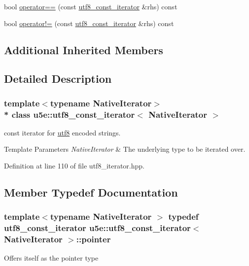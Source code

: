 {\bf }\par
\begin{DoxyCompactItemize}
\item 
bool \hyperlink{classu5e_1_1utf8__const__iterator_ac6110586d118a41b5eeac023f4788ccb}{operator==} (const \hyperlink{classu5e_1_1utf8__const__iterator}{utf8\+\_\+const\+\_\+iterator} \&rhs) const 
\item 
bool \hyperlink{classu5e_1_1utf8__const__iterator_a776a1dae46835c0871a945c0da418498}{operator!=} (const \hyperlink{classu5e_1_1utf8__const__iterator}{utf8\+\_\+const\+\_\+iterator} \&rhs) const 
\end{DoxyCompactItemize}

\subsection*{Additional Inherited Members}


\subsection{Detailed Description}
\subsubsection*{template$<$typename Native\+Iterator$>$\\*
class u5e\+::utf8\+\_\+const\+\_\+iterator$<$ Native\+Iterator $>$}

const iterator for \hyperlink{classu5e_1_1utf8}{utf8} encoded strings. 


\begin{DoxyTemplParams}{Template Parameters}
{\em Native\+Iterator} & The underlying type to be iterated over. \\
\hline
\end{DoxyTemplParams}


Definition at line 110 of file utf8\+\_\+iterator.\+hpp.



\subsection{Member Typedef Documentation}
\subsubsection[{\texorpdfstring{pointer}{pointer}}]{\setlength{\rightskip}{0pt plus 5cm}template$<$typename Native\+Iterator $>$ typedef {\bf utf8\+\_\+const\+\_\+iterator} {\bf u5e\+::utf8\+\_\+const\+\_\+iterator}$<$ Native\+Iterator $>$\+::{\bf pointer}}\hypertarget{classu5e_1_1utf8__const__iterator_ab8b6bc6c6b56d00ff1a8b9a896be6f3f}{}\label{classu5e_1_1utf8__const__iterator_ab8b6bc6c6b56d00ff1a8b9a896be6f3f}
Offers itself as the pointer type 

